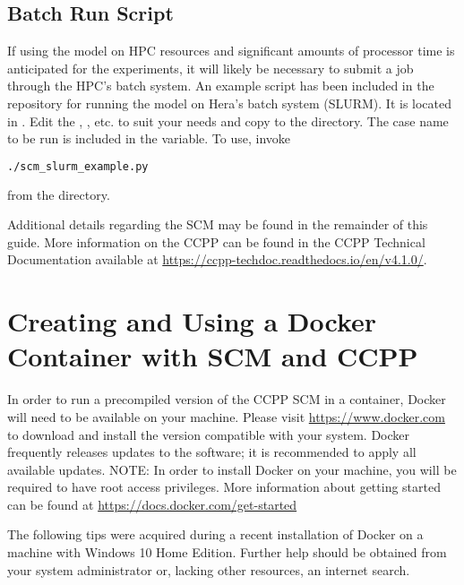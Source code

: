 \subsection{Batch Run Script}

If using the model on HPC resources and significant amounts of processor time is anticipated for the experiments, it will likely be necessary to submit a job through the HPC's batch system. An example script has been included in the repository for running the model on Hera's batch system (SLURM). It is located in . Edit the , , etc. to suit your needs and copy to the  directory. The case name to be run is included in the  variable. To use, invoke
\begin{lstlisting}[language=bash]
./scm_slurm_example.py
\end{lstlisting}
from the  directory.

Additional details regarding the SCM may be found in the remainder of this guide. More information on the CCPP can be found in the CCPP Technical Documentation available at \url{https://ccpp-techdoc.readthedocs.io/en/v4.1.0/}.

\section{Creating and Using a Docker Container with SCM and CCPP}
\label{docker}

In order to run a precompiled version of the CCPP SCM in a container, Docker will need to be available on your machine. Please visit \url{https://www.docker.com} to download and install the version compatible with your system. Docker frequently releases updates to the software; it is recommended to apply all available updates. NOTE: In order to install Docker on your machine, you will be required to have root access privileges. More information about getting started can be found at \url{https://docs.docker.com/get-started}

The following tips were acquired during a recent installation of Docker on a machine with Windows 10 Home Edition. Further help should be obtained from your system administrator or, lacking other resources, an internet search.

